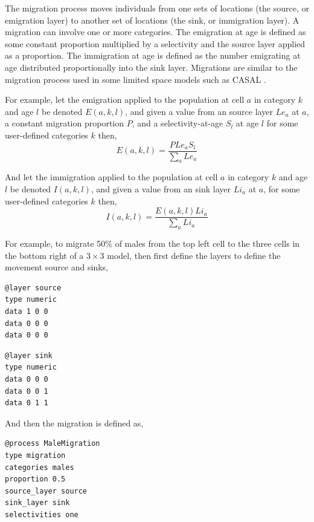 The migration process moves individuals from one sets of locations (the source, or emigration layer) to another set of locations (the sink, or immigration layer). A migration can involve one or more categories. The emigration at age is defined as some constant proportion multiplied by a selectivity and the source layer applied as a proportion. The immigration at age is defined as the number emigrating at age distributed proportionally into the sink layer. Migrations are similar to the migration process used in some limited space models such as CASAL \citep{1388}.

For example, let the emigration applied to the population at cell $a$ in category $k$ and age $l$ be denoted $E(a,k,l)$, and given a value from an source layer $Le_a$  at $a$, a constant migration proportion $P$, and a selectivity-at-age $S_l$ at age $l$ for some user-defined categories $k$ then, 
\begin{equation}
  E(a,k,l) = \frac{P Le_a S_l }{\sum\limits_a Le_a}
\end{equation}

And let the immigration applied to the population at cell $a$ in category $k$ and age $l$ be denoted $I(a,k,l)$, and given a value from an sink layer $Li_a$  at $a$, for some user-defined categories $k$ then, 
\begin{equation}
  I(a,k,l) = \frac{E(a,k,l) Li_a }{\sum\limits_a Li_a} 
\end{equation}

For example, to migrate 50\% of males from the top left cell to the three cells in the bottom right of a $3\times3$ model, then first define the layers to define the movement source and sinks, 

{\small{\begin{verbatim}
@layer source
type numeric
data 1 0 0
data 0 0 0
data 0 0 0
\end{verbatim}}}

{\small{\begin{verbatim}
@layer sink
type numeric
data 0 0 0
data 0 0 1
data 0 1 1
\end{verbatim}}}

And then the migration is defined as,

{\small{\begin{verbatim}
@process MaleMigration
type migration
categories males
proportion 0.5
source_layer source
sink_layer sink
selectivities one
\end{verbatim}}}

\subsubsection{}


